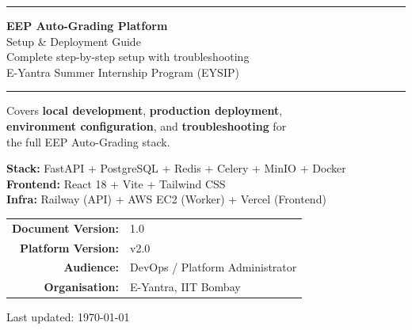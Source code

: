 \documentclass[12pt,a4paper]{article}
\begin{document}

\begin{titlepage}
  \centering
  \vspace*{1.5cm}

  {\color{setupCyan}\rule{\linewidth}{4pt}}
  \vspace{0.5cm}

  {\Huge\bfseries\color{setupCyan} EEP Auto-Grading Platform}\\[0.7em]
  {\LARGE\color{setupGreen} Setup \& Deployment Guide}\\[0.4em]
  {\large\color{darkgray} Complete step-by-step setup with troubleshooting}\\[0.2em]
  {\normalsize\color{midgray} E-Yantra Summer Internship Program (EYSIP)}

  \vspace{0.5cm}
  {\color{setupCyan}\rule{\linewidth}{4pt}}

  \vspace{1.2cm}

  \begin{tcolorbox}[colback=lightgray, colframe=setupGreen, width=0.92\linewidth]
    \centering
    \large Covers \textbf{local development}, \textbf{production deployment},\\
    \textbf{environment configuration}, and \textbf{troubleshooting} for\\
    the full EEP Auto-Grading stack.
  \end{tcolorbox}

  \vspace{0.8cm}

  \begin{tcolorbox}[colback=codebg, colframe=codeborder, width=0.9\linewidth]
    \color{codetext}\ttfamily\small
    \faLayerGroup\enspace \textbf{Stack:} FastAPI + PostgreSQL + Redis + Celery + MinIO + Docker\\
    \faCube\enspace \textbf{Frontend:} React 18 + Vite + Tailwind CSS\\
    \faCloud\enspace \textbf{Infra:} Railway (API) + AWS EC2 (Worker) + Vercel (Frontend)
  \end{tcolorbox}

  \vfill

  \begin{tabular}{rl}
    \textbf{Document Version:} & 1.0 \\
    \textbf{Platform Version:} & v2.0 \\
    \textbf{Audience:}         & DevOps / Platform Administrator \\
    \textbf{Organisation:}     & E-Yantra, IIT Bombay \\
  \end{tabular}

  \vspace{0.8cm}
  {\color{darkgray}\small Last updated: \today}
\end{titlepage}
\end{document}
